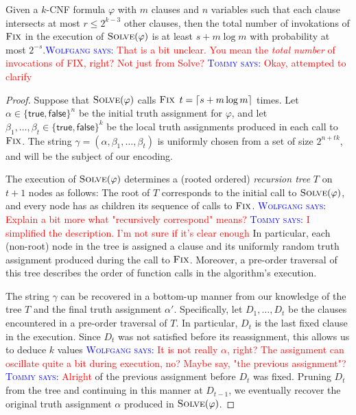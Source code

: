 \documentclass{patmorin}
\newcommand{\aremark}[3]{\textcolor{blue}{\textsc{#1 #2:}}
  \textcolor{red}{\textsf{#3}}}
\newcommand{\tommy}[2][says]{\aremark{Tommy}{#1}{#2}}
\newcommand{\wolfgang}[2][says]{\aremark{Wolfgang}{#1}{#2}}
\begin{document}
\begin{thm}
%
  Given a $k$-CNF formula $\varphi$ with $m$ clauses and $n$ variables
  such that each clause intersects at most $r \le 2^{k - 3}$ other
  clauses, then the total number of invokations of $\textsc{Fix}$ in
  the execution of $\textsc{Solve}(\varphi)$ is at least
  $s + m \log m$ with probability at most $2^{-s}$.\wolfgang{That is a
    bit unclear. You mean the \emph{total number} of invocations of
    FIX, right? Not just from Solve?} \tommy{Okay, attempted to
    clarify}
\end{thm}
\begin{proof}
  Suppose that $\textsc{Solve}(\varphi)$ calls $\textsc{Fix}$
  $t = {\lceil s + m\log m \rceil}$ times. Let
  $\alpha \in \{\textsf{true}, \textsf{false}\}^n$ be the initial
  truth assignment for $\varphi$, and let
  $\beta_1, \ldots, \beta_t \in \{\textsf{true}, \textsf{false}\}^k$
  be the local truth assignments produced in each call to
  $\textsc{Fix}$. The string
  $\gamma = (\alpha, \beta_1, \ldots, \beta_t)$ is uniformly chosen
  from a set of size $2^{n + tk}$, and will be the subject of our
  encoding.

  The execution of $\textsc{Solve}(\varphi)$ determines a (rooted
  ordered) \emph{recursion tree} $T$ on $t + 1$ nodes as follows: The
  root of $T$ corresponds to the initial call to
  $\textsc{Solve}(\varphi)$, and every node has as children its
  sequence of calls to $\textsc{Fix}$.
  \wolfgang{Explain a bit more what "recursively correspond" means?}
  \tommy{I simplified the description. I'm not sure if it's clear
    enough}
  In particular, each (non-root) node in the tree is assigned a clause
  and its uniformly random truth assignment produced during the call
  to $\textsc{Fix}$. Moreover, a pre-order traversal of this tree
  describes the order of function calls in the algorithm's execution.

  The string $\gamma$ can be recovered in a bottom-up manner from our
  knowledge of the tree $T$ and the final truth assignment
  $\alpha'$. Specifically, let $D_1, \dots, D_t$ be the clauses
  encountered in a pre-order traversal of $T$. In particular, $D_t$ is
  the last fixed clause in the execution. Since $D_t$ was not
  satisfied before its reassignment, this allows us to deduce $k$
  values \wolfgang{It is not really $\alpha$, right? The assignment
    can oscillate quite a bit during execution, no? Maybe say, "the
    previous assignment"?} \tommy{Alright} of the previous assignment
  before $D_t$ was fixed. Pruning $D_t$ from the tree and continuing
  in this manner at $D_{t - 1}$, we eventually recover the original
  truth assignment $\alpha$ produced in $\textsc{Solve}(\varphi)$.


\end{proof}
\end{document}
